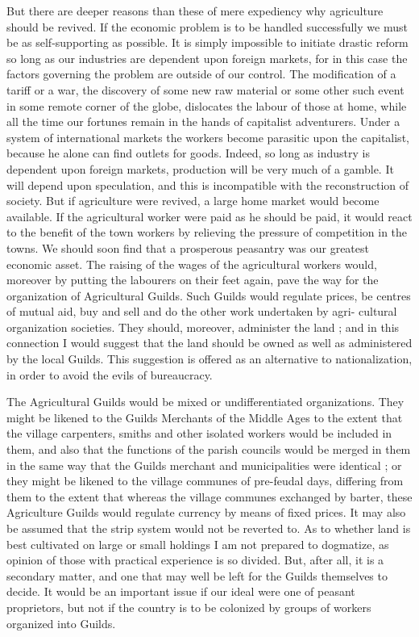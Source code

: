 \documentclass{book}
\begin{document}
But there are deeper reasons than these of mere expediency why agriculture should be revived. If the economic problem is to be handled successfully we must be as self-supporting as possible. It is simply impossible to initiate drastic reform so long as our industries are dependent upon foreign markets, for in this case the factors governing the problem are outside of our control. The modification of a tariff or a war, the discovery of some new raw material or some other such event in some remote corner of the globe, dislocates the labour of those at home, while all the time our fortunes remain in the hands of capitalist adventurers. Under a system of international markets the workers become parasitic upon the capitalist, because he alone can find outlets for goods. Indeed, so long as industry is dependent upon foreign markets, production will be very much of a gamble. It will depend upon speculation, and this is incompatible with the reconstruction of society. But if agriculture were revived, a large home market would become available. If the agricultural worker were paid as he should be paid, it would react to the benefit of the town workers by relieving the pressure of competition in the towns. We should soon find that a prosperous peasantry was our greatest economic asset. The raising of the wages of the agricultural workers would, moreover by putting the labourers on their feet again, pave the way for the organization of Agricultural Guilds. Such Guilds would regulate prices, be centres of mutual aid, buy and sell and do the other work undertaken by agri- cultural organization societies. They should, moreover, administer the land ; and in this connection I would suggest that the land should be owned as well as administered by the local Guilds. This suggestion is offered as an alternative to nationalization, in order to avoid the evils of bureaucracy.

The Agricultural Guilds would be mixed or undifferentiated organizations. They might be likened to the Guilds Merchants of the Middle Ages to the extent that the village carpenters, smiths and other isolated workers would be included in them, and also that the functions of the parish councils would be merged in them in the same way that the Guilds merchant and municipalities were identical ; or they might be likened to the village communes of pre-feudal days, differing from them to the extent that whereas the village communes exchanged by barter, these Agriculture Guilds would regulate currency by means of fixed prices. It may also be assumed that the strip system would not be reverted to. As to whether land is best cultivated on large or small holdings I am not prepared to dogmatize, as opinion of those with practical experience is so divided. But, after all, it is a secondary matter, and one that may well be left for the Guilds themselves to decide. It would be an important issue if our ideal were one of peasant proprietors, but not if the country is to be colonized by groups of workers organized into Guilds.
\end{document}
